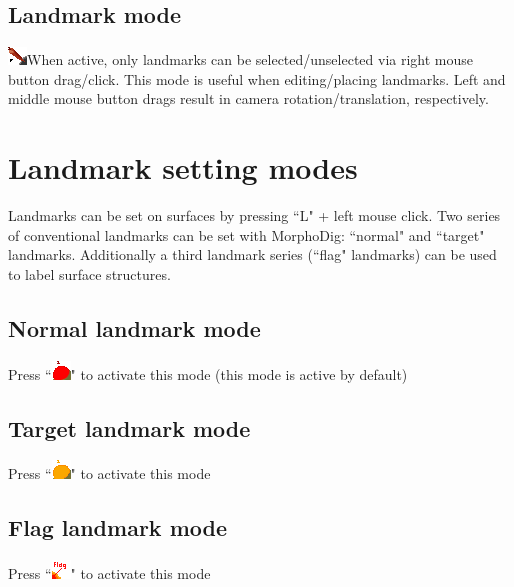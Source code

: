 \subsection{Landmark mode}
  \includegraphics[scale=0.7]{images/pixmap/Landmarks2.png}When active, only landmarks can be selected/unselected via right mouse button drag/click. This mode is useful when editing/placing landmarks. Left and middle mouse button drags result in camera rotation/translation, respectively.

\section{Landmark setting modes}
Landmarks can be set on surfaces by pressing ``L" + left mouse click. 
Two series of conventional landmarks can be set with MorphoDig: ``normal" and ``target" landmarks. Additionally a third landmark series (``flag" landmarks) can be used to label surface structures. 
\subsection{Normal landmark mode}	
Press ``\includegraphics[scale=0.7]{images/pixmap/Landmarks4.png}" to activate this mode (this mode is active by default)
\subsection{Target landmark mode}	

Press ``\includegraphics[scale=0.7]{images/pixmap/Landmarks6.png}"  to activate this mode
\subsection{Flag landmark mode}	

Press ``\includegraphics[scale=0.7]{images/pixmap/Flag01.png}" to activate this mode
